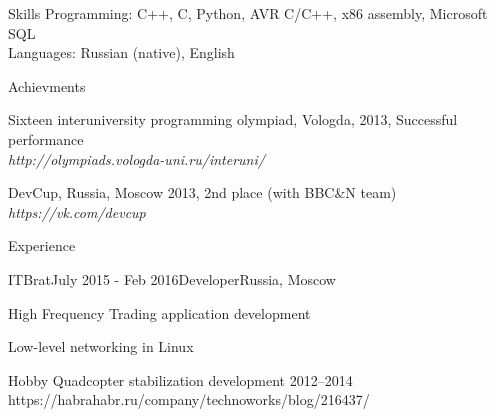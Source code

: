 \documentclass{resume} %
\begin{document}
\begin{rSection}{Skills}
Programming: C++, C, Python, AVR C/C++, x86 assembly, Microsoft SQL\\
Languages: Russian (native), English
\end{rSection}


\begin{rSection}{Achievments}
\item Sixteen interuniversity programming olympiad, Vologda, 2013, Successful performance \\
\hfill {\em http://olympiads.vologda-uni.ru/interuni/}
\item DevCup, Russia, Moscow 2013, 2nd place (with BBC\&N team)\\
\hfill {\em https://vk.com/devcup}
\end{rSection}


\begin{rSection}{Experience}
	
	
	
	\begin{rSubsection}{ITBrat}{July 2015 - Feb 2016}{Developer}{Russia, Moscow}
		\item High Frequency Trading application development
		\item Low-level networking in Linux
	\end{rSubsection}
	
	
\end{rSection}

\begin{rSection}{Hobby}
	Quadcopter stabilization development 2012--2014\\
	https://habrahabr.ru/company/technoworks/blog/216437/
\end{rSection}

\end{document}
